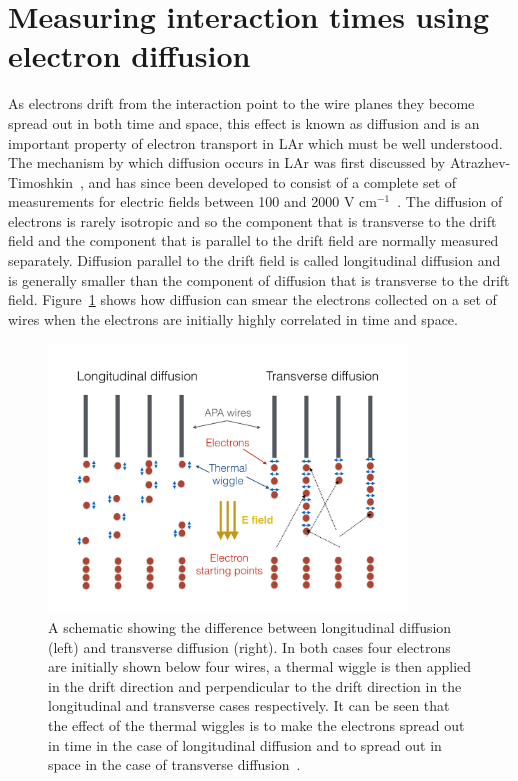 \section{Measuring interaction times using electron diffusion}  \label{DiffusionAnalysis}%
As electrons drift from the interaction point to the wire planes they become spread out in both time and space, this effect is known as diffusion and is an important property of electron transport in LAr which must be well understood. The mechanism by which diffusion occurs in LAr was first discussed by Atrazhev-Timoshkin~\citep{Atrazhev-Timoshkin}, and has since been developed to consist of a complete set of measurements for electric fields between 100 and 2000 V cm$^{-1}$~\citep{Li:2015rqa}. The diffusion of electrons is rarely isotropic and so the component that is transverse to the drift field and the component that is parallel to the drift field are normally measured separately. Diffusion parallel to the drift field is called longitudinal diffusion and is generally smaller than the component of diffusion that is transverse to the drift field. Figure~\ref{fig:DomDiffSchem} shows how diffusion can smear the electrons collected on a set of wires when the electrons are initially highly correlated in time and space. \\

\begin{figure}[h!]
  \centering
  \includegraphics[width=0.85\textwidth]{DiffusionSchematic}
  \caption[Schematic showing the process of diffusion]{A schematic showing the difference between longitudinal diffusion (left) and transverse diffusion (right). In both cases four electrons are initially shown below four wires, a thermal wiggle is then applied in the drift direction and perpendicular to the drift direction in the longitudinal and transverse cases respectively. It can be seen that the effect of the thermal wiggles is to make the electrons spread out in time in the case of longitudinal diffusion and to spread out in space in the case of transverse diffusion~\citep{DomSeptMeeting}.}
  \label{fig:DomDiffSchem}
\end{figure}


